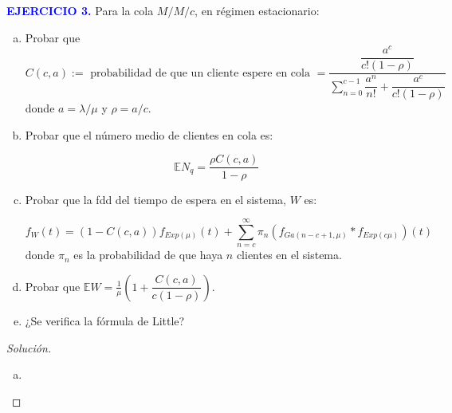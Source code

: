 \documentclass[]{article}
\theoremstyle{plain}
\newenvironment{solucion}{\begin{proof}[Soluci\'on]}{\end{proof}}
\begin{document}
\textcolor{blue}{\textbf{EJERCICIO 3.}} Para la cola $M/M/c$, en régimen estacionario:
\begin{enumerate}[(a)]
	\item Probar que
	$$ C(c,a):= \mbox{ probabilidad de que un cliente espere en cola } = \dfrac{ \dfrac{a^{c}}{c! (1- \rho)}}{ \displaystyle \sum_{n=0}^{c-1} \dfrac{a^{n}}{n!} + \dfrac{a^{c}}{c! (1-\rho)} }$$ donde $a=\lambda / \mu$ y $\rho = a/c$.
		\item Probar que el número medio de clientes en cola es:
	
	$$ \mathbb{E} N_{q} = \dfrac{ \rho C(c,a)}{1- \rho}  $$
	
	\item Probar que la fdd del tiempo de espera en el sistema, $W$ es:
	
	$$ f_{W}(t) = (1-C(c,a)) f_{Exp(\mu)} (t) + \displaystyle \sum_{n=c}^{\infty} \pi_{n} ( f_{Ga(n-c+1,\mu)} * f_{Exp(c\mu)})(t)   $$ donde $\pi_{n}$ es la probabilidad de que haya $n$ clientes en el sistema.
	
	\item Probar que $\mathbb{E}W = \frac{1}{\mu} \left( 1+ \dfrac{C(c,a)}{c ( 1- \rho)} \right)$.
	
	\item ¿Se verifica la fórmula de Little? 
		
	\end{enumerate}
	
	\begin{solucion}
		
		\begin{enumerate}[(a)]
			\item 
		\end{enumerate}
		
	\end{solucion}
	
	
	
	
	
\end{document}
